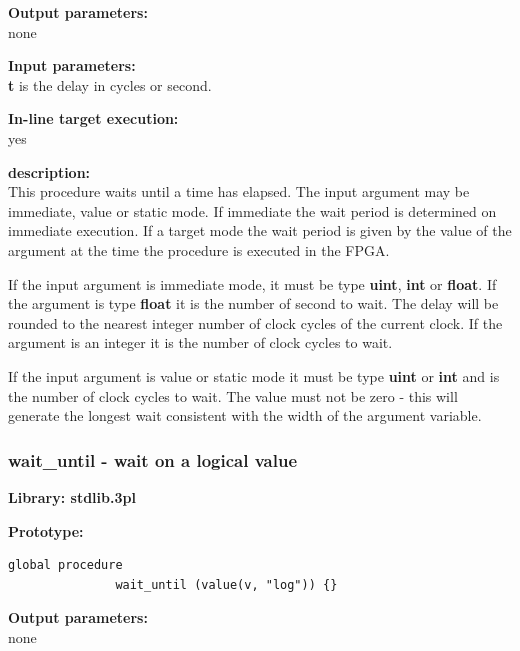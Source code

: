             {\bf Output parameters:} \\
            none

            {\bf Input parameters:} \\            
            {\bf t} is the delay in cycles or second.
        
            {\bf In-line target execution:} \\
            yes

            {\bf description:} \\
            This procedure waits until a time has elapsed. The input
            argument may be immediate, value or static mode. If immediate
            the wait period is determined on immediate execution. If
            a target mode the wait period is given by the value of the
            argument at the time the procedure is executed in the FPGA.
            
            If the input argument is immediate mode, it must be type {\bf
            uint}, {\bf int} or {\bf float}. If the argument is type {\bf
            float} it is the number of second to wait. The delay will be
            rounded to the nearest integer number of clock cycles of the
            current clock. If the argument is an integer it is the number of
            clock cycles to wait.

            If the input argument is value or static mode it must be type {\bf
            uint} or {\bf int} and is the number of clock cycles to wait. The
            value must not be zero - this will generate the longest wait
            consistent with the width of the argument variable.
           


        \subsubsection{wait\_until - wait on a logical value}\label{sec:lpwaituntil}

            {\bf Library: stdlib.3pl}

            {\bf Prototype:} \\
            \vsp
            \begin{lstlisting}[gobble=12, language=threepl]
               global procedure
               wait_until (value(v, "log")) {}
            \end{lstlisting}

            {\bf Output parameters:} \\
            none

